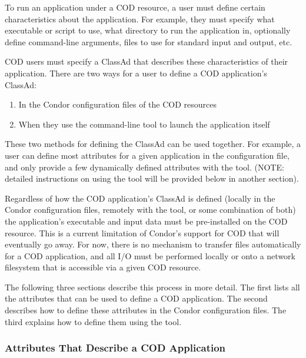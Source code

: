 To run an application under a COD resource, a user must define certain
characteristics about the application.
For example, they must specify what executable or script to use, what
directory to run the application in, optionally define command-line
arguments, files to use for standard input and output, etc.

COD users must specify a ClassAd that describes these characteristics
of their application.  
There are two ways for a user to define a COD application's ClassAd:

\begin{enumerate}
\item In the Condor configuration files of the COD resources
\item When they use the  command-line tool to launch the
application itself
\end{enumerate}

These two methods for defining the ClassAd can be used together.
For example, a user can define most attributes for a given application
in the configuration file, and only provide a few dynamically defined
attributes with the  tool.
(NOTE: detailed instructions on using the  tool will be
provided below in another section).

Regardless of how the COD application's ClassAd is defined (locally in
the Condor configuration files, remotely with the  tool,
or some combination of both) the application's executable and input
data must be pre-installed on the COD resource.
This is a current limitation of Condor's support for COD that will
eventually go away.
For now, there is no mechanism to transfer files automatically for a
COD application, and all I/O must be performed locally or onto a
network filesystem that is accessible via a given COD resource.

The following three sections describe this process in more detail.
The first lists all the attributes that can be used to define a COD
application.
The second describes how to define these attributes in the Condor
configuration files.
The third explains how to define them using the  tool.


\subsubsection{\label{sec:cod-application-attributes}
Attributes That Describe a COD Application}

